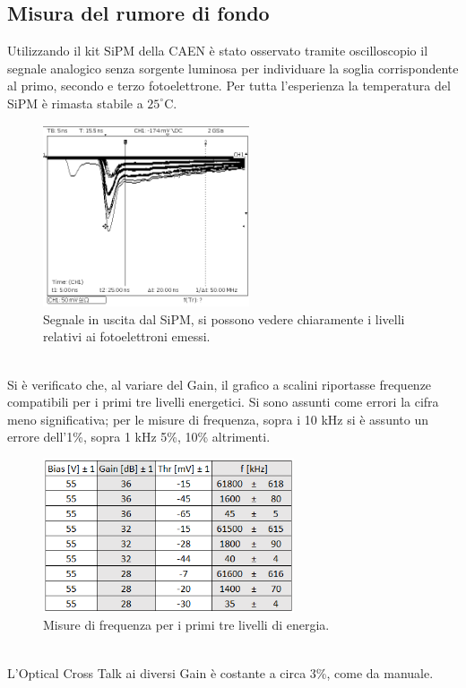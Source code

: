 \documentclass[11pt]{article} %
\begin{document}
\subsection{Misura del rumore di fondo}
Utilizzando il kit SiPM della CAEN è stato osservato tramite oscilloscopio il segnale analogico senza sorgente luminosa per individuare la soglia corrispondente al primo, secondo e terzo fotoelettrone. Per tutta l'esperienza la temperatura del SiPM è rimasta stabile a $25^{\circ}$C.
\begin{figure}[h!]
\begin{center}
\includegraphics[width=230px]{img/SIPM01.PNG}
\caption{Segnale in uscita dal SiPM, si possono vedere chiaramente i livelli relativi ai fotoelettroni emessi.}
\label{fig:Sipm}
\end{center}
\end{figure}
\\Si è verificato che, al variare del Gain, il grafico a scalini riportasse frequenze compatibili per i primi tre livelli energetici. Si sono assunti come errori la cifra meno significativa; per le misure di frequenza, sopra i 10 kHz si è assunto un errore dell'1\%, sopra 1 kHz 5\%, 10\% altrimenti.
\begin{figure}[h!]
\begin{center}
\includegraphics[width=280px]{img/tabnoise.png}
\caption{Misure di frequenza per i primi tre livelli di energia.}
\label{fig:Sipm}
\end{center}
\end{figure}
\\
L'Optical Cross Talk ai diversi Gain è costante a circa 3\%,  come da manuale.
\end{document}
